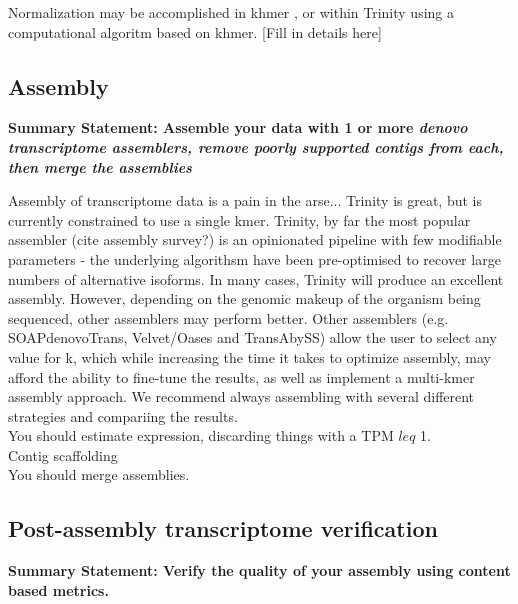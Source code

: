 Normalization may be accomplished in khmer \citep{Pell:2012id}, or within Trinity using a computational algoritm based on khmer. [Fill in details here]

\subsection{Assembly}

\begin{center}
\bf{Summary Statement: Assemble your data with 1 or more \it{denovo} transcriptome assemblers, remove poorly supported contigs from each, then merge the assemblies}
\end{center}

Assembly of transcriptome data is a pain in the arse... Trinity is great, but is currently constrained to use a single kmer. Trinity, by far the most popular assembler (cite assembly survey?) is an opinionated pipeline with few modifiable parameters - the underlying algorithsm have been pre-optimised to recover large numbers of alternative isoforms. In many cases, Trinity will produce an excellent assembly. However, depending on the genomic makeup of the organism being sequenced, other assemblers may perform better. Other assemblers (e.g. SOAPdenovoTrans, Velvet/Oases and TransAbySS) allow the user to select any value for k, which while increasing the time it takes to optimize assembly, may afford the ability to fine-tune the results, as well as implement a multi-kmer assembly approach. We recommend always assembling with several different strategies and compariing the results. \\

You should estimate expression, discarding things with a TPM $leq$ 1. \\

Contig scaffolding \\

You should merge assemblies. \\

\subsection{Post-assembly transcriptome verification}

\begin{center}
\bf{Summary Statement: Verify the quality of your assembly using content based metrics.}
\end{center}


